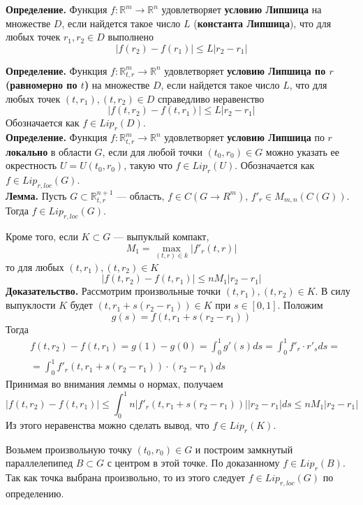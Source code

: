 \textbf{Определение.} Функция $f:\mathbb{R}^m \to \mathbb{R}^n$ удовлетворяет \textbf{условию Липшица} на множестве $D$, если найдется такое число $L$ (\textbf{константа Липшица}), что для любых точек $r_1, r_2 \in D$ выполнено
\begin{equation*}
    |f(r_2) - f(r_1)| \le L|r_2 - r_1|
\end{equation*}

\noindent \textbf{Определение.} Функция $f: \mathbb{R}_{t,r}^{m} \to \mathbb{R}^n$ удовлетворяет \textbf{условию Липшица по $r$ (равномерно по $t$)} на множестве $D$, если найдется такое число $L$, что для любых точек $(t,r_1), (t,r_2) \in D$ справедливо неравенство \begin{equation*}
    |f(t,r_2) - f(t,r_1)| \le L|r_2 - r_1|
\end{equation*}
Обозначается как $f \in Lip_r(D)$.\\

\noindent \textbf{Определение.} Функция $f:\mathbb{R}_{t,r}^{m} \to \mathbb{R}^n$ удовлетворяет \textbf{условию Липшица} по $r$ \textbf{локально} в области $G$, если для любой точки $(t_0, r_0) \in G$ можно указать ее окрестность $U = U(t_0, r_0)$, такую что $f \in Lip_r(U)$. Обозначается как $f \in Lip_{r,loc}(G)$.\\

\noindent \textbf{Лемма.} Пусть $G \subset \mathbb{R}_{t,r}^{n + 1}$ --- область, $f \in C(G \to R^m)$, $f'_r \in M_{m,n}(C(G))$. Тогда $f \in Lip_{r,loc}(G)$.

Кроме того, если $K \subset G$ --- выпуклый компакт,
\begin{equation*}
    M_1 = \max_{(t,r) \in k} |f'_r(t,r)|
\end{equation*}
то для любых $(t,r_1), (t,r_2) \in K$
\begin{equation*}
    |f(t,r_2) - f(t, r_1)| \le nM_1|r_2 - r_1|
\end{equation*}
\textbf{Доказательство.} Рассмотрим произвольные точки $(t,r_1), (t,r_2) \in K$. В силу выпуклости $K$ будет $(t, r_1 + s(r_2 - r_1)) \in K$ при $s \in [0,1]$. Положим
\begin{equation*}
    g(s) = f(t, r_1 + s(r_2 - r_1))
\end{equation*}
Тогда
\begin{equation*}
    \begin{aligned}
        &f(t,r_2) - f(t,r_1) = g(1) - g(0) = \int_0^1 g'(s)ds = \int_0^1 f'_r\cdot r'_sds =\\
        &= \int_0^1 f'_r(t, r_1 + s(r_2 - r_1))\cdot(r_2 - r_1)ds
    \end{aligned}
\end{equation*}
Принимая во внимания леммы о нормах, получаем
\begin{equation*}
    |f(t,r_2) - f(t,r_1)| \le \int_0^1 n|f'_r(t,r_1 + s(r_2 - r_1))||r_2 - r_1|ds \le nM_1|r_2 - r_1|
\end{equation*}
Из этого неравенства можно сделать вывод, что $f \in Lip_r(K)$.

Возьмем произвольную точку $(t_0, r_0) \in G$ и построим замкнутый параллелепипед $B \subset G$ с центром в этой точке. По доказанному $f \in Lip_r(B)$. Так как точка выбрана произвольно, то из этого следует $f \in Lip_{r,loc}(G)$ по определению.
